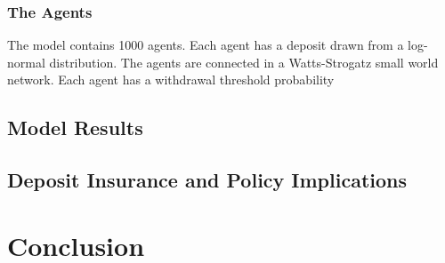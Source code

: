 \documentclass[12pt]{article}
\begin{document}
\begin{doublespace}

\subsubsection{The Agents}
The model contains 1000 agents. Each agent has a deposit drawn from a log-normal
distribution. The agents are connected in a Watts-Strogatz small world network. 
Each agent has a withdrawal threshold probability



\subsection{Model Results}

\subsection{Deposit Insurance and Policy Implications}

\section{Conclusion}
\end{doublespace}


\end{document}
